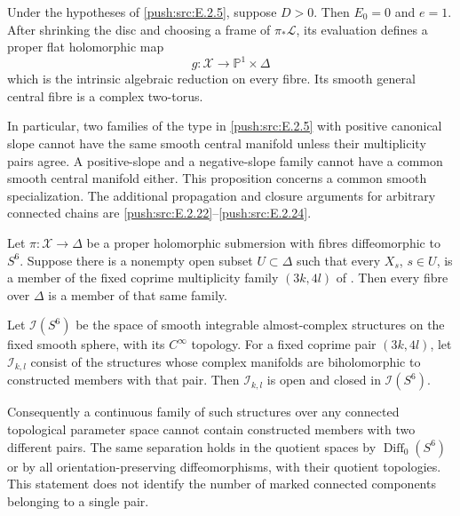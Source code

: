 
\begin{proposition}\hypertarget{tag-033E}{}\label{push:src:E.2.6}


Under the hypotheses of \ref{push:src:E.2.5}, suppose $D>0$.  Then $E_0=0$
and $e=1$.  After shrinking the disc and choosing a frame of
$\pi_*\mathcal L$, its evaluation defines a proper flat
holomorphic map
\[
 g:\mathcal X\longrightarrow\mathbb P^1\times\Delta
\]
which is the intrinsic algebraic reduction on every fibre.
Its smooth general central fibre is a complex two-torus.

In particular, two families of the type in \ref{push:src:E.2.5} with positive
canonical slope cannot have the same smooth central manifold
unless their multiplicity pairs agree.  A positive-slope and
a negative-slope family cannot have a common smooth central
manifold either.  This proposition concerns a common smooth
specialization.  The additional propagation and closure
arguments for arbitrary connected chains are \ref{push:src:E.2.22}--\ref{push:src:E.2.24}.
\end{proposition}

\begin{proposition}\hypertarget{tag-0338}{}\label{push:src:E.2.22}


Let $\pi:\mathcal X\to\Delta$ be a proper holomorphic
submersion with fibres diffeomorphic to $S^6$.  Suppose
there is a nonempty open subset $U\subset\Delta$ such
that every $X_s$, $s\in U$, is a member of the fixed
coprime multiplicity family $(3k,4l)$ of .
Then every fibre over $\Delta$ is a member of that
same family.
\end{proposition}

\begin{corollary}\hypertarget{tag-033A}{}\label{push:src:E.2.24}


Let $\mathcal I(S^6)$ be the space of smooth integrable
almost-complex structures on the fixed smooth sphere,
with its $C^\infty$ topology.  For a fixed coprime pair
$(3k,4l)$, let $\mathcal I_{k,l}$ consist of the structures
whose complex manifolds are biholomorphic to constructed
members with that pair.  Then $\mathcal I_{k,l}$ is open
and closed in $\mathcal I(S^6)$.

Consequently a continuous family of such structures
over any connected topological parameter space cannot
contain constructed members with two different pairs.
The same separation holds in the quotient spaces by
$\operatorname{Diff}_0(S^6)$ or by all orientation-preserving
diffeomorphisms, with their quotient topologies.
This statement does not identify the number of marked
connected components belonging to a single pair.
\end{corollary}

